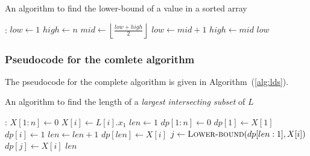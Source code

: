\documentclass[12pt]{report}
\begin{document}
    \begin{algorithm}
        \caption{An algorithm to find the lower-bound of a value in a sorted array}
        \label{alg:lower-bound}
        \begin{algorithmic}[1]
            :
                \State $low \gets 1$
                \State $high \gets n$
                    \State $mid \gets \left\lfloor \frac{low + high}{2} \right\rfloor$
                        \State $low \gets mid + 1$
                    \Else
                        \State $high \gets mid$
                    \EndIf
                \EndWhile
                \State \Return $low$
            \EndProcedure
        \end{algorithmic}
    \end{algorithm}

    \subsubsection*{Pseudocode for the comlete algorithm}
    The pseudocode for the complete algorithm is given in Algorithm~(\ref{alg:lds}).

    \begin{algorithm}
        \caption{An algorithm to find the length of a \textit{largest intersecting subset} of $L$}
        \label{alg:lds}
        \begin{algorithmic}[1]
            :
                \State {}
                \State $X[1:n] \gets 0$
                    \State $X[i] \gets L[i].x_{1}$
                \EndFor
                \State $len \gets 1$
                \State $dp[1:n] \gets 0$
                \State $dp[1] \gets X[1]$
                    \State $dp[i] \gets 1$
                        \State $len \gets len + 1$
                        \State $dp[len] \gets X[i]$
                    \Else
                        \State $j \gets \Call{Lower-bound}{dp[len:1], X[i]}$
                        \State $dp[j] \gets X[i]$
                    \EndIf
                \EndFor
            \State \Return $len$
            \EndProcedure
        \end{algorithmic}
    \end{algorithm}
\end{document}
